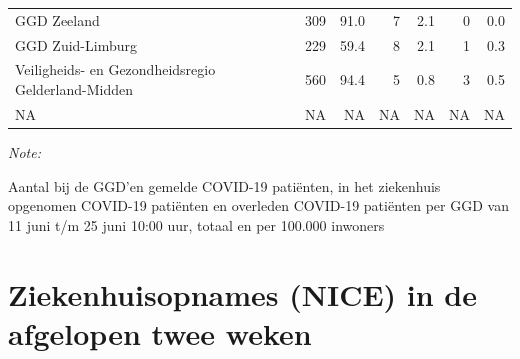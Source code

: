 \documentclass[
  english,
  man,floatsintext]{apa6}
\begin{document}
\begin{table}
\begin{threeparttable}
\begin{tabular}{lrrrrrr}
GGD Zeeland & 309 & 91.0 & 7 & 2.1 & 0 & 0.0\\
GGD Zuid-Limburg & 229 & 59.4 & 8 & 2.1 & 1 & 0.3\\
Veiligheids- en Gezondheidsregio Gelderland-Midden & 560 & 94.4 & 5 & 0.8 & 3 & 0.5\\
NA & NA & NA & NA & NA & NA & NA\\
\bottomrule
\end{tabular}
\begin{tablenotes}
\item \textit{Note: } 
\item Aantal bij de GGD’en gemelde COVID-19 patiënten, in het ziekenhuis opgenomen COVID-19 patiënten en overleden COVID-19 patiënten per GGD van 11 juni t/m 25 juni 10:00 uur, totaal en per 100.000 inwoners
\end{tablenotes}
\end{threeparttable}
\endgroup{}
\end{table}

\newpage

\hypertarget{ziekenhuisopnames-nice-in-de-afgelopen-twee-weken}{%
\section{Ziekenhuisopnames (NICE) in de afgelopen twee weken}\label{ziekenhuisopnames-nice-in-de-afgelopen-twee-weken}}
\end{document}
